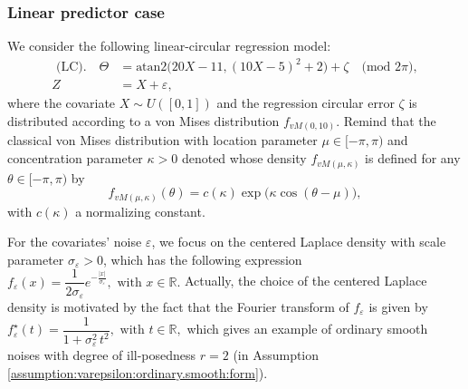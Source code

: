 \documentclass[11pt,a4paper,openany]{article}
\newcommand{\Atan}{\mbox{atan2}}
\def\R{\mathbb{R}}
\begin{document}
\subsubsection{Linear predictor case}
We consider the following linear-circular regression model:
\begin{align}
	\textrm{ (LC)}. \quad \Theta  &=  \Atan \big( 20 X - 11, (10 X - 5 )^{2} + 2 \big)  +  \zeta  \quad  \textrm{(mod $2\pi$)}, \label{regression.circular:numerical.simu:modelM1}
	\nonumber  
	\\
	Z &= X + \varepsilon ,
\end{align}
%  
where the covariate $X \sim U([0,1])$ and the regression circular error  $\zeta$ is distributed according to a von Mises distribution $f_{v M(0,10)}$. Remind that the classical von  Mises distribution with location parameter $\mu \in  [-\pi,\pi) $ and  concentration parameter $\kappa >0$  denoted  whose density $f_{vM(\mu, \kappa)}$ is defined for any $\theta \in [-\pi,\pi)$ by
\begin{equation}\label{vmdensity}
	f_{vM(\mu, \kappa)}(\theta)=c(\kappa)  \exp \big({\kappa}  \cos( \theta - {\mu} ) \big),
\end{equation}
with $c(\kappa)$ a normalizing constant.

\medskip  

For the covariates' noise $\varepsilon$, we focus on the centered Laplace density with scale parameter $\sigma_{\varepsilon} > 0$, which has the following expression 
$	f_{\varepsilon}(x) = \dfrac{1}{2 \sigma_{\varepsilon} }  e^{- \frac{|x|}{\sigma_{\varepsilon}}}, \textrm{ with } x \in \R.$ 
Actually, the choice of the centered Laplace density is motivated by the fact that the Fourier transform of $f_{\varepsilon}$ is given by  
$	f_{\varepsilon}^{\star}(t)  =  \dfrac{1}{ 1 +  \sigma_{\varepsilon}^{2}  \,  t^{2} }  , \textrm{ with }  t  \in  \R  , $
which gives an example of ordinary smooth noises with degree of ill-posedness $r = 2$ (in Assumption \eqref{assumption:varepsilon:ordinary.smooth:form}).  
\end{document}
